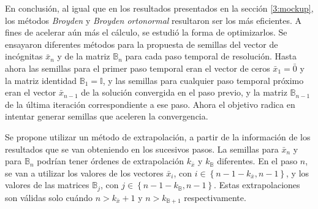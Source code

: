 En conclusión, al igual que en los resultados presentados en la sección \ref{3:mockup}, los métodos \textit{Broyden} y \textit{Broyden ortonormal} resultaron ser los más eficientes.
A fines de acelerar aún más el cálculo, se estudió la forma de optimizarlos.
Se ensayaron diferentes métodos para la propuesta de semillas del vector de incógnitas $\bar{x}_n$ y de la matriz $\mathbb{B}_n$ para cada paso temporal de resolución.
Hasta ahora las semillas para el primer paso temporal eran el vector de ceros $\bar{x}_1=\bar{0}$ y la matriz identidad $\mathbb{B}_1=\mathbb{I}$,
y las semillas para cualquier paso temporal próximo eran el vector $\bar{x}_{n-1}$ de la solución convergida en el paso previo,
y la matriz $\mathbb{B}_{n-1}$ de la última iteración correspondiente a ese paso.
Ahora el objetivo radica en intentar generar semillas que aceleren la convergencia.

Se propone utilizar un método de extrapolación, a partir de la información de los resultados que se van obteniendo en los sucesivos pasos.
La semillas para $\bar{x}_n$ y para $\mathbb{B}_n$ podrían tener órdenes de extrapolación $k_{\bar{x}}$ y $k_{\mathbb{B}}$ diferentes.
En el paso $n$, se van a utilizar los valores de los vectores $\bar{x}_i$, con $i  \in  \left \{ n-1-k_{\bar{x}}, n-1\right \}$,
y los valores de las matrices $\mathbb{B}_j$, con $j  \in  \left \{ n-1-k_{\mathbb{B}}, n-1\right \}$.
Estas extrapolaciones son válidas solo cuándo $n>k_{\bar{x}}+1$ y $n>k_{\mathbb{B}+1}$ respectivamente.

